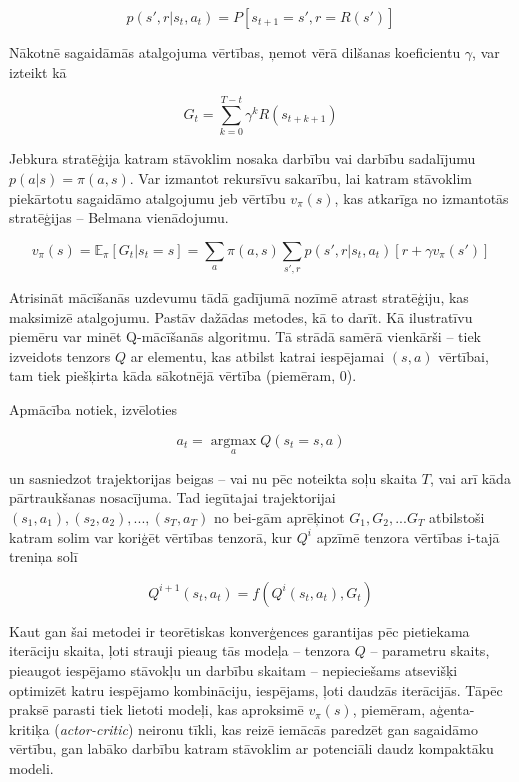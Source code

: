 \documentclass[12pt, a4paper]{article}
\numberwithin{equation}{section} %
\begin{document}
\begin{equation}
    p(s', r \vert s_t, a_t) = P[s_{t+1}=s', r=R(s')]
\end{equation}

Nākotnē sagaidāmās atalgojuma vērtības, ņemot vērā dilšanas koeficientu $\gamma$,  var izteikt kā

\begin{equation}
    G_t = \sum_{k=0}^{T-t} \gamma^k R(s_{t+k+1})
\end{equation}

Jebkura stratēģija katram stāvoklim nosaka darbību vai darbību sadalījumu $p(a \vert s) = \pi(a,s)$. Var izmantot rekursīvu sakarību, lai katram stāvoklim piekārtotu sagaidāmo atalgojumu jeb vērtību $v_{\pi}(s)$, kas atkarīga no izmantotās stratēģijas -- Belmana vienādojumu.

\begin{equation}
    v_{\pi}(s) = \mathbb{E}_{\pi}[G_t \vert s_t = s] = \sum_{a}\pi(a,s)\sum_{s', r}p(s', r \vert s_t, a_t)[r + \gamma v_{\pi}(s')]
\end{equation}

Atrisināt mācīšanās uzdevumu tādā gadījumā nozīmē atrast stratēģiju, kas maksimizē atalgojumu. Pastāv dažādas metodes, kā to darīt. Kā ilustratīvu piemēru var minēt Q-mācīšanās algoritmu. Tā strādā samērā vienkārši -- tiek izveidots tenzors $Q$ ar elementu, kas atbilst katrai iespējamai $(s,a)$ vērtībai, tam tiek piešķirta kāda sākotnējā vērtība (piemēram, 0). 

Apmācība notiek, izvēloties

\begin{equation}
    a_t = \operatorname*{argmax}_a Q(s_t = s, a)
\end{equation}

un sasniedzot trajektorijas beigas -- vai nu pēc noteikta soļu skaita $T$, vai arī kāda pārtraukšanas nosacījuma. Tad iegūtajai trajektorijai $(s_1, a_1), (s_2, a_2), ..., (s_T, a_T)$ no bei-gām aprēķinot $G_1, G_2, ... G_T$ atbilstoši katram solim var koriģēt vērtības tenzorā, kur $Q^i$ apzīmē tenzora vērtības i-tajā treniņa solī

\begin{equation}
    Q^{i+1}(s_t,a_t)=f(Q^{i}(s_t, a_t), G_t)
\end{equation}

Kaut gan šai metodei ir teorētiskas konverģences garantijas pēc pietiekama iterāciju skaita, ļoti strauji pieaug tās modeļa -- tenzora $Q$ -- parametru skaits, pieaugot iespējamo stāvokļu un darbību skaitam -- nepieciešams atsevišķi optimizēt katru iespējamo kombināciju, iespējams, ļoti daudzās iterācijās. Tāpēc praksē parasti tiek lietoti modeļi, kas aproksimē $v_{\pi}(s)$, piemēram, aģenta-kritiķa (\textit{actor-critic}) neironu tīkli, kas reizē iemācās paredzēt gan sagaidāmo vērtību, gan labāko darbību katram stāvoklim ar potenciāli daudz kompaktāku modeli.
\end{document}
